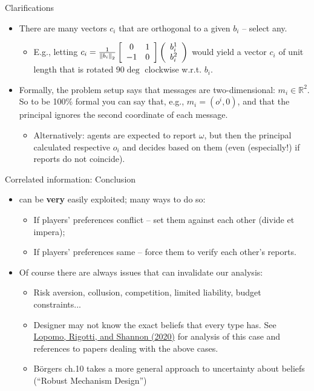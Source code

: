 \documentclass[english,10pt
,aspectratio=169
]{beamer}
\begin{document}
\begin{frame}{Clarifications}
	\begin{itemize}
		\item There are many vectors $c_i$ that are orthogonal to a given $b_i$ -- select any.
		\begin{itemize}
			\item E.g., letting $c_i = \frac{1}{\left\| b_i \right\|_2 } \left[ \begin{array}{c c} 0 & 1 \\ -1 & 0 \end{array} \right] \left( \begin{array}{c}
				b_i^1 \\ b_i^2
			\end{array} \right)$ would yield a vector $c_i$ of unit length that is rotated $90\deg$ clockwise w.r.t. $b_i$.
		\end{itemize}
		\item Formally, the problem setup says that messages are two-dimensional: $m_i \in \mathbb{R}^2$. So to be 100\% formal you can say that, e.g., $m_i = (o^i, 0)$, and that the principal ignores the second coordinate of each message.
		\begin{itemize}
			\item Alternatively: agents are expected to report $\omega$, but then the principal calculated respective $o_i$ and decides based on them (even (especially!) if reports do not coincide).
		\end{itemize}
	\end{itemize}
\end{frame}


\begin{frame}{Correlated information: Conclusion}
\begin{itemize}
	\item {} can be \alert{\textbf{very} easily exploited}; many ways to do so:
	\begin{itemize}
		\item If players' preferences conflict -- set them against each other (divide et impera);
		\item If players' preferences same -- force them to verify each other's reports.
	\end{itemize}
	\item Of course there are always issues that can invalidate our analysis:
	\begin{itemize}
		\item Risk aversion, collusion, competition, limited liability, budget constraints...
		\item Designer may not know the exact beliefs that every type has. See \href{https://doi.org/10.1016/j.jet.2020.105088}{\uline{Lopomo, Rigotti, and Shannon (2020)}} for analysis of this case and references to papers dealing with the above cases.
		\item B{\"o}rgers ch.10 takes a more general approach to uncertainty about beliefs (``Robust Mechanism Design'')
	\end{itemize}
\end{itemize}
\end{frame}
\end{document}
